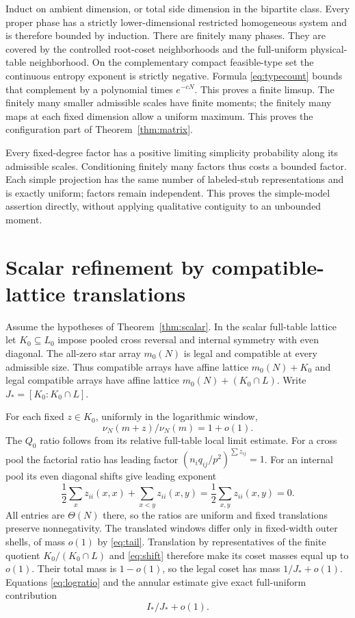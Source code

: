 \documentclass[11pt]{article}
\begin{document}
Induct on ambient dimension, or total side dimension in the bipartite class. Every proper phase has a strictly lower-dimensional restricted homogeneous system and is therefore bounded by induction. There are finitely many phases. They are covered by the controlled root-coset neighborhoods and the full-uniform physical-table neighborhood. On the complementary compact feasible-type set the continuous entropy exponent is strictly negative. Formula \eqref{eq:typecount} bounds that complement by a polynomial times $e^{-cN}$. This proves a finite limsup. The finitely many smaller admissible scales have finite moments; the finitely many maps at each fixed dimension allow a uniform maximum. This proves the configuration part of Theorem~\ref{thm:matrix}.

Every fixed-degree factor has a positive limiting simplicity probability along its admissible scales. Conditioning finitely many factors thus costs a bounded factor. Each simple projection has the same number of labeled-stub representations and is exactly uniform; factors remain independent. This proves the simple-model assertion directly, without applying qualitative contiguity to an unbounded moment.

\section{Scalar refinement by compatible-lattice translations}
Assume the hypotheses of Theorem~\ref{thm:scalar}. In the scalar full-table lattice let $K_0\subseteq L_0$ impose pooled cross reversal and internal symmetry with even diagonal. The all-zero star array $m_0(N)$ is legal and compatible at every admissible size. Thus compatible arrays have affine lattice $m_0(N)+K_0$ and legal compatible arrays have affine lattice $m_0(N)+(K_0\cap L)$. Write $J_*=[K_0:K_0\cap L]$.

For each fixed $z\in K_0$, uniformly in the logarithmic window,
\begin{equation}\label{eq:shift}
 \nu_N(m+z)/\nu_N(m)=1+o(1).
\end{equation}
The $Q_0$ ratio follows from its relative full-table local limit estimate. For a cross pool the factorial ratio has leading factor $(n_iq_{ij}/p^2)^{\sum z_{ij}}=1$. For an internal pool its even diagonal shifts give leading exponent
\[
 \frac12\sum_x z_{ii}(x,x)+\sum_{x<y}z_{ii}(x,y)
 =\frac12\sum_{x,y}z_{ii}(x,y)=0.
\]
All entries are $\Theta(N)$ there, so the ratios are uniform and fixed translations preserve nonnegativity. The translated windows differ only in fixed-width outer shells, of mass $o(1)$ by \eqref{eq:tail}. Translation by representatives of the finite quotient $K_0/(K_0\cap L)$ and \eqref{eq:shift} therefore make its coset masses equal up to $o(1)$. Their total mass is $1-o(1)$, so the legal coset has mass $1/J_*+o(1)$. Equations \eqref{eq:logratio} and the annular estimate give exact full-uniform contribution
\begin{equation}\label{eq:centralexact}
 I_*/J_*+o(1).
\end{equation}
\end{document}
